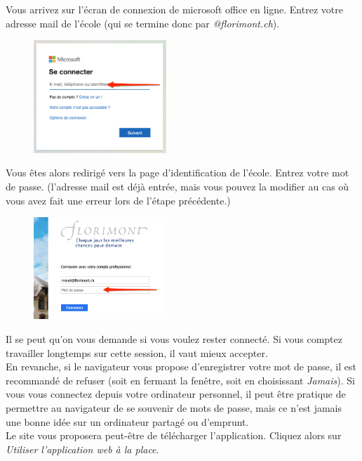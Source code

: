 Vous arrivez sur l'écran de connexion de microsoft office en ligne. Entrez votre adresse mail de l'école (qui se termine donc par \textit{@florimont.ch}).

\begin{figure}[h]
\includegraphics[width=5cm]{./images/teams/ecran_connexion_office_com_crop}
\centering
\end{figure}

Vous êtes alors redirigé vers la page d'identification de l’école. Entrez votre mot de passe. (l'adresse mail est déjà entrée, mais vous pouvez la modifier au cas où vous avez fait une erreur lors de l'étape précédente.)

\begin{figure}[h]
\includegraphics[width=5cm]{./images/teams/ecran_connexion_florimont_crop}
\centering
\end{figure}

Il se peut qu'on vous demande si vous voulez rester connecté. Si vous comptez travailler longtemps sur cette session, il vaut mieux accepter.\\

En revanche, si le navigateur vous propose d'enregistrer votre mot de passe, il est recommandé de refuser (soit en fermant la fenêtre, soit en choisissant \textit{Jamais}). Si vous vous connectez depuis votre ordinateur personnel, il peut être pratique de permettre au navigateur de se souvenir de mots de passe, mais ce n'est jamais une bonne idée sur un ordinateur partagé ou d'emprunt.\\

Le site vous proposera peut-être de télécharger l’application. Cliquez alors sur \textit{Utiliser l’application web à la place}.\\

